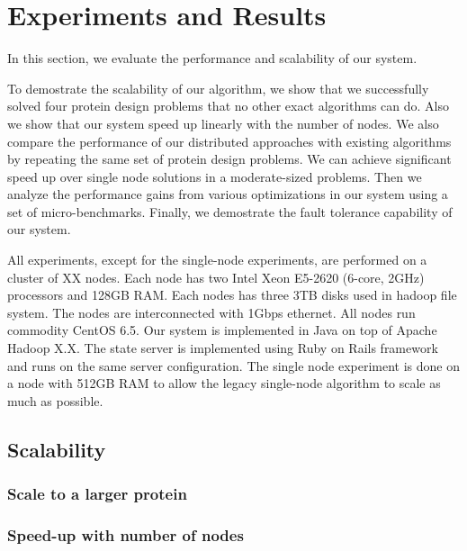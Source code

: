 \section{Experiments and Results}

In this section, we evaluate the performance and scalability of our system.

To demostrate the scalability of our algorithm, we show that we successfully solved four protein design problems that no other exact algorithms can do.  Also we show that our system speed up linearly with the number of nodes. We also compare the performance of our distributed approaches with existing algorithms by repeating the same set of protein design problems.  We can achieve significant speed up over single node solutions in a moderate-sized problems.  Then we analyze the performance gains from various optimizations in our system using a set of micro-benchmarks.  Finally, we demostrate the fault tolerance capability of our system.

All experiments, except for the single-node experiments, are performed on a cluster of XX nodes.  Each node has two Intel Xeon E5-2620 (6-core, 2GHz) processors and 128GB RAM.  Each nodes has three 3TB disks used in hadoop file system.  The nodes are interconnected with 1Gbps ethernet.  All nodes run commodity CentOS 6.5.  Our system is implemented in Java on top of Apache Hadoop X.X.  The state server is implemented using Ruby on Rails framework and runs on the same server configuration.  The single node experiment is done on a node with 512GB RAM to allow the legacy single-node algorithm to scale as much as possible.

\subsection{Scalability}

\subsubsection{Scale to a larger protein}


\subsubsection{Speed-up with number of nodes}\

